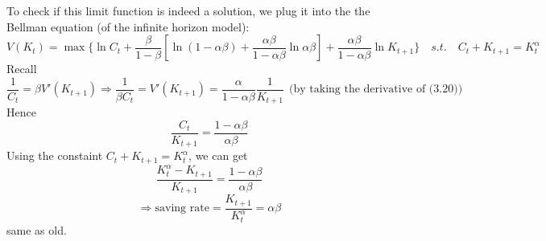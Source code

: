 \documentclass[twoside]{article}
\begin{document}
To check if this limit function is indeed a solution, we plug it into the the Bellman equation (of the infinite horizon model):
\begin{equation}
    V(K_t) = \max \bigg \{ \ln C_t + \frac{\beta}{1- \beta}[\ln (1-\alpha \beta) + \frac{\alpha \beta}{1- \alpha \beta}\ln \alpha \beta] + \frac{\alpha \beta}{1- \alpha \beta} \ln K_{t+1} \bigg \} \quad s.t. \quad C_{t} + K_{t+1} = K_{t}^\alpha
\end{equation}
Recall
\begin{equation}
    \frac{1}{C_t} = \beta V'(K_{t+1}) \Longrightarrow \frac{1}{ \beta C_t } = V'(K_{t+1}) =  \frac{\alpha}{1- \alpha \beta} \frac{1}{K_{t+1}}~~\text{(by taking the derivative of (3.20))}
\end{equation}
Hence
\begin{equation}
    \frac{C_t}{K_{t+1}} = \frac{1- \alpha \beta}{\alpha \beta}
\end{equation}
Using the constaint $C_t + K_{t+1} = K_t^\alpha$,
we can get
\begin{equation}
    \frac{K_t^\alpha - K_{t+1}}{K_{t+1}} = \frac{1- \alpha \beta}{\alpha \beta} 
\end{equation}
\begin{equation}
    \Longrightarrow \text{saving rate} = \frac{K_{t+1}}{K_t^\alpha} = \alpha \beta
\end{equation}
same as old.
\end{document}
